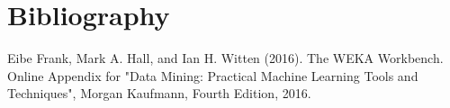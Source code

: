 \documentclass[letter]{article} %
\begin{document}
\section*{Bibliography}

Eibe Frank, Mark A. Hall, and Ian H. Witten (2016). The WEKA Workbench. Online Appendix for "Data Mining: Practical Machine Learning Tools and Techniques", Morgan Kaufmann, Fourth Edition, 2016.



\end{document}
